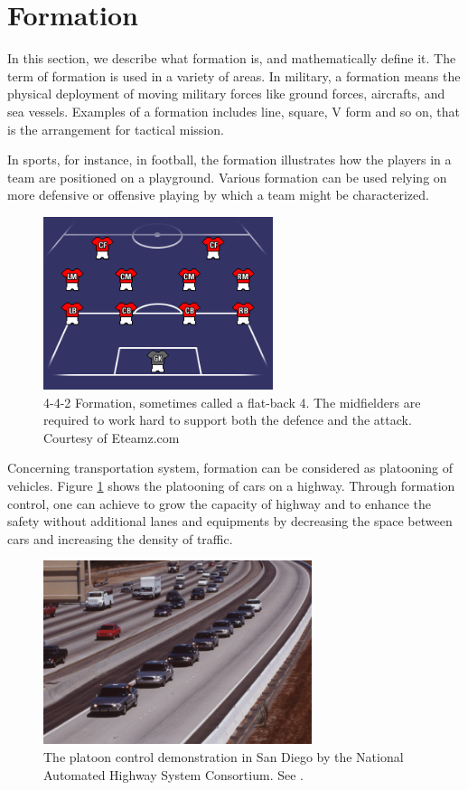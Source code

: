 \documentclass[11pt, a4paper, oneside, openany, reqno]{book}
\theoremstyle{definition}
\theoremstyle{remark}
\numberwithin{equation}{chapter} %
\begin{document}
\section{Formation}

In this section, we describe what formation is, and mathematically define it.
The term of formation is used in a variety of areas. 
In military, a formation means the physical deployment of moving military forces 
like ground forces, aircrafts, and sea vessels. 
Examples of a formation includes line, square, V form and so on, 
that is the arrangement for tactical mission.

In sports, 
for instance, in football,
the formation illustrates how the players in a team are positioned on a playground.
Various formation can be used relying on more defensive or offensive playing 
by which a team might be characterized.
\begin{figure}[htp]
	\centering
	\includegraphics[width=0.60\textwidth]{football.png}
	\caption{4-4-2 Formation, sometimes called a flat-back 4. 
	The midfielders are required to work hard to support both the defence and the attack.
	Courtesy of Eteamz.com}
\end{figure}

Concerning transportation system, formation can be considered as platooning of vehicles.
Figure \ref{platoon} shows the platooning of cars on a highway. 
Through formation control,
one can achieve to grow the capacity of highway and to enhance the safety 
without additional lanes and equipments
by decreasing the space between cars and increasing the density of traffic.
\begin{figure}[htp]
	\centering
	\includegraphics[width=0.70\textwidth]{platoon.png}
	\caption{The platoon control demonstration in San Diego 
	by the National Automated Highway System Consortium. See \cite{path}.}
	\label{platoon}
\end{figure}
\end{document}

